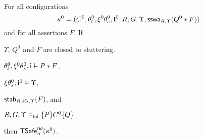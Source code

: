 


\begin{lemma}[Frame]\label{lem:Frame}
For all configurations  
$$\kappa^0=(C^0,\theta^0_l,\xi^0\theta^0_s,\intp^0,R,G,\Upsilon, \sswa{Q^0 * F}{R}{\Upsilon})$$
and for all assertions $F$. 
If 
\begin{compactenum}
\item 
$\Upsilon$, $Q^0$ and $F$ are closed to stuttering.
\item \label{lem:frame:preP}
$\theta^0_l,\xi^0\theta^0_s,\intp\vDash P*F$,
\item \label{lem:frame:preInv}
$\xi\theta^0_s,\intp^0\vDash \Upsilon$,
\item \label{lem:frame:stable}
$\stable{F}{R \cup G}{\Upsilon}$, and 
\item \label{lem:frame:safe}
$R,G,\Upsilon \vDash_{\ltid}  \{ P\} C^0 \{Q\}$
\end{compactenum}
then  
$\safe_n(\kappa^0)$.
\end{lemma}

